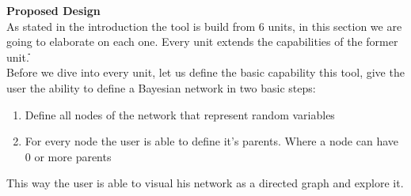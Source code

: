 \documentclass{article}
\begin{document}
    \textbf{Proposed Design}\\
    As stated in the introduction the tool is build from 6 units, in this section we are going to elaborate on each one. Every unit extends the capabilities of the former unit.ֿֿ\\
    Before we dive into every unit, let us define the basic capability this tool, give the user the ability to define a Bayesian network in two basic steps:
    \begin{enumerate}
        \item Define all nodes of the network that represent random variables
        \item For every node the user is able to define it's parents. Where a node can have 0 or more parents
    \end{enumerate}
    This way the user is able to visual his network as a directed graph and explore it.
\end{document}
